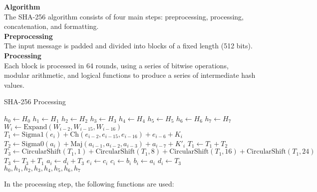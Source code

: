 \documentclass[11pt]{article}
\begin{document}
\textbf{Algorithm}\\
The SHA-256 algorithm consists of four main steps: preprocessing, processing, concatenation, and formatting.\\
\textbf{Preprocessing}\\
The input message is padded and divided into blocks of a fixed length (512 bits).\\
\textbf{Processing}\\
Each block is processed in 64 rounds, using a series of bitwise operations, modular arithmetic, and logical functions to produce a series of intermediate hash values.\\
\begin{algorithm}
\caption{SHA-256 Processing}
\begin{algorithmic}[1]
\State $h_0 \gets H_0$
\State $h_1 \gets H_1$
\State $h_2 \gets H_2$
\State $h_3 \gets H_3$
\State $h_4 \gets H_4$
\State $h_5 \gets H_5$
\State $h_6 \gets H_6$
\State $h_7 \gets H_7$
\State $W_i \gets \text{Expand}(W_{i-2}, W_{i-15}, W_{i-16})$
\State $T_1 \gets \text{Sigma1}(e_i) + \text{Ch}(e_{i-2}, e_{i-15}, e_{i-16}) + e_{i-6} + K_i$
\State $T_2 \gets \text{Sigma0}(a_i) + \text{Maj}(a_{i-1}, a_{i-2}, a_{i-3}) + a_{i-7} + K'_i$
\State $T_1 \gets T_1 + T_2$
\State $T_3 \gets \text{CircularShift}(T_1, 1) + \text{CircularShift}(T_1, 8) + \text{CircularShift}(T_1, 16) + \text{CircularShift}(T_1, 24)$
\State $T_3 \gets T_3 + T_1$
\State $a_i \gets d_i + T_3$
\State $e_i \gets c_i$
\State $c_i \gets b_i$
\State $b_i \gets a_i$
\State $d_i \gets T_3$
\EndFor
\State \Return $h_0, h_1, h_2, h_3, h_4, h_5, h_6, h_7$
\EndProcedure
\end{algorithmic}
\end{algorithm}
In the processing step, the following functions are used:
\end{document}
